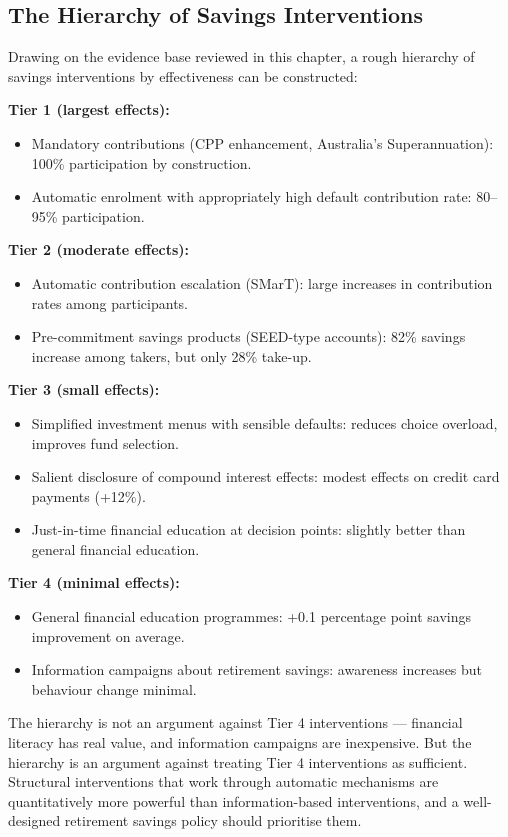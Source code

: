 \documentclass[12pt, letterpaper]{article}
\begin{document}
\subsection{The Hierarchy of Savings Interventions}


Drawing on the evidence base reviewed in this chapter, a rough hierarchy of savings interventions by effectiveness can be constructed:

\textbf{Tier 1 (largest effects):}
\begin{itemize}
\item Mandatory contributions (CPP enhancement, Australia's Superannuation): 100\% participation by construction.
\item Automatic enrolment with appropriately high default contribution rate: 80--95\% participation.
\end{itemize}

\textbf{Tier 2 (moderate effects):}
\begin{itemize}
\item Automatic contribution escalation (SMarT): large increases in contribution rates among participants.
\item Pre-commitment savings products (SEED-type accounts): 82\% savings increase among takers, but only 28\% take-up.
\end{itemize}

\textbf{Tier 3 (small effects):}
\begin{itemize}
\item Simplified investment menus with sensible defaults: reduces choice overload, improves fund selection.
\item Salient disclosure of compound interest effects: modest effects on credit card payments (+12\%).
\item Just-in-time financial education at decision points: slightly better than general financial education.
\end{itemize}

\textbf{Tier 4 (minimal effects):}
\begin{itemize}
\item General financial education programmes: +0.1 percentage point savings improvement on average.
\item Information campaigns about retirement savings: awareness increases but behaviour change minimal.
\end{itemize}

The hierarchy is not an argument against Tier 4 interventions --- financial literacy has real value, and information campaigns are inexpensive. But the hierarchy is an argument against treating Tier 4 interventions as sufficient. Structural interventions that work through automatic mechanisms are quantitatively more powerful than information-based interventions, and a well-designed retirement savings policy should prioritise them.
\end{document}
